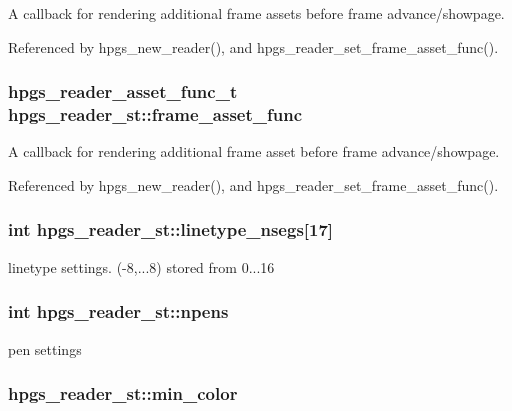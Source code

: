 A callback for rendering additional frame assets before frame advance/showpage. 

Referenced by hpgs\_\-new\_\-reader(), and hpgs\_\-reader\_\-set\_\-frame\_\-asset\_\-func().
\subsubsection[frame\_\-asset\_\-func]{\setlength{\rightskip}{0pt plus 5cm}hpgs\_\-reader\_\-asset\_\-func\_\-t {\bf hpgs\_\-reader\_\-st::frame\_\-asset\_\-func}}\label{structhpgs__reader__st_00151e4215b46b4053a089cc95aa5f69}


A callback for rendering additional frame asset before frame advance/showpage. 

Referenced by hpgs\_\-new\_\-reader(), and hpgs\_\-reader\_\-set\_\-frame\_\-asset\_\-func().
\subsubsection[linetype\_\-nsegs]{\setlength{\rightskip}{0pt plus 5cm}int {\bf hpgs\_\-reader\_\-st::linetype\_\-nsegs}[17]}\label{structhpgs__reader__st_3f097e4de0c64307c99d18e4597ebb2e}


linetype settings. (-8,...8) stored from 0...16 
\subsubsection[npens]{\setlength{\rightskip}{0pt plus 5cm}int {\bf hpgs\_\-reader\_\-st::npens}}\label{structhpgs__reader__st_cbb97d4f9a7d2500c1068177fb1feb32}


pen settings 
\subsubsection[min\_\-color]{ {\bf hpgs\_\-reader\_\-st::min\_\-color}}\label{structhpgs__reader__st_1024bff0bc3ef54be296c6e98e4cf202}


